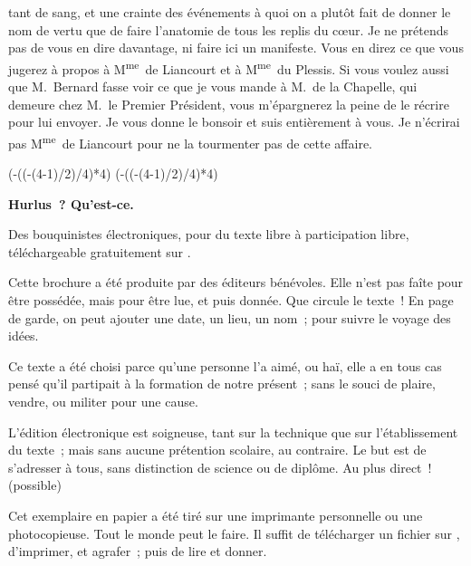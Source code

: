 \documentclass[french,twoside]{book} %
\def\truncdiv#1#2{((#1-(#2-1)/2)/#2)}
\def\moduloop#1#2{(#1-\truncdiv{#1}{#2}*#2)}
\def\modulo#1#2{\number\numexpr\moduloop{#1}{#2}\relax}
\begin{document}
tant de sang, et une crainte des événements à quoi on a plutôt fait de donner le nom de vertu que de faire l’anatomie de tous les replis du cœur. Je ne prétends pas de vous en dire davantage, ni faire ici un manifeste. Vous en direz ce que vous jugerez à propos à M\textsuperscript{me} de Liancourt et à M\textsuperscript{me} du Plessis. Si vous voulez aussi que M. Bernard fasse voir ce que je vous mande à M. de la Chapelle, qui demeure chez M. le Premier Président, vous m’épargnerez la peine de le récrire pour lui envoyer. Je vous donne le bonsoir et suis entièrement à vous. Je n’écrirai pas M\textsuperscript{me} de Liancourt pour ne la tourmenter pas de cette affaire.
 


\ifbooklet
  \pagestyle{empty}
  \clearpage
  \ifnum\modulo{\value{page}}{4}=0 \hbox{}\newpage\hbox{}\newpage\fi
  \ifnum\modulo{\value{page}}{4}=1 \hbox{}\newpage\hbox{}\newpage\fi


  \hbox{}\newpage
  \ifodd\value{page}\hbox{}\newpage\fi
  {\centering\color{rubric}\bfseries\noindent\large
    Hurlus ? Qu’est-ce.\par
    \bigskip
  }
  \noindent Des bouquinistes électroniques, pour du texte libre à participation libre,
  téléchargeable gratuitement sur \href{https://hurlus.fr}{}.\par
  \bigskip
  \noindent Cette brochure a été produite par des éditeurs bénévoles.
  Elle n’est pas faîte pour être possédée, mais pour être lue, et puis donnée.
  Que circule le texte !
  En page de garde, on peut ajouter une date, un lieu, un nom ; pour suivre le voyage des idées.
  \par

  Ce texte a été choisi parce qu’une personne l’a aimé,
  ou haï, elle a en tous cas pensé qu’il partipait à la formation de notre présent ;
  sans le souci de plaire, vendre, ou militer pour une cause.
  \par

  L’édition électronique est soigneuse, tant sur la technique
  que sur l’établissement du texte ; mais sans aucune prétention scolaire, au contraire.
  Le but est de s’adresser à tous, sans distinction de science ou de diplôme.
  Au plus direct ! (possible)
  \par

  Cet exemplaire en papier a été tiré sur une imprimante personnelle
   ou une photocopieuse. Tout le monde peut le faire.
  Il suffit de
  télécharger un fichier sur \href{https://hurlus.fr}{},
  d’imprimer, et agrafer ; puis de lire et donner.\par
\end{document}
